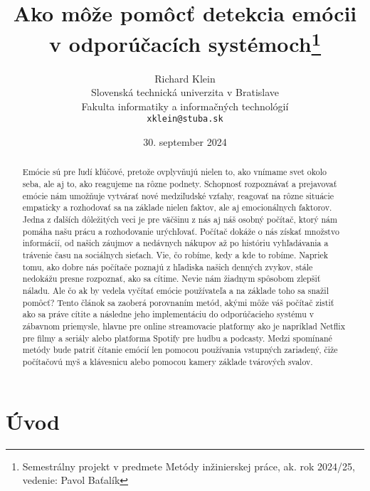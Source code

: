 \documentclass[10pt,slovak,a4paper]{article}
\title{Ako môže pomôcť detekcia emócii v odporúčacích systémoch\thanks{Semestrálny projekt v predmete Metódy inžinierskej práce, ak. rok 2024/25, vedenie: Pavol Baťalík}} %
\author{Richard Klein\\[2pt]
	{\small Slovenská technická univerzita v Bratislave}\\
	{\small Fakulta informatiky a informačných technológií}\\
	{\small \texttt{xklein@stuba.sk}}
	}
\date{\small 30. september 2024} %
\begin{document}
\maketitle
\begin{abstract}
Emócie sú pre ľudí kľúčové, pretože ovplyvňujú nielen to, ako vnímame svet okolo seba, ale aj to, ako reagujeme na rôzne podnety. Schopnosť rozpoznávať a prejavovať emócie nám umožňuje vytvárať nové medziľudské vzťahy, reagovať na rôzne situácie empaticky a rozhodovať sa na základe nielen faktov, ale aj emocionálnych faktorov. Jedna z ďalších dôležitých veci je pre väčšinu z nás aj náš osobný počítač, ktorý nám pomáha našu prácu a rozhodovanie urýchľovať. Počítač dokáže o nás získať množstvo informácií, od našich záujmov a nedávnych nákupov až po históriu vyhľadávania a trávenie času na sociálnych sieťach. Vie, čo robíme, kedy a kde to robíme. Napriek tomu, ako dobre nás počítače poznajú z hľadiska našich denných zvykov, stále nedokážu presne rozpoznať, ako sa cítime. Nevie nám žiadnym spôsobom zlepšiť náladu. Ale čo ak by vedela vyčítať emócie používateľa a na základe toho sa snažil pomôcť? Tento článok sa zaoberá porovnaním metód, akými môže váš počítač zistiť ako sa práve cítite a následne jeho implementáciu do odporúčacieho systému v zábavnom priemysle, hlavne pre online streamovacie platformy ako je napríklad Netflix pre filmy a seriály alebo platforma Spotify pre hudbu a podcasty. Medzi spomínané metódy bude patriť čítanie emócií len pomocou používania vstupných zariadený, čiže počítačovú myš a klávesnicu alebo pomocou kamery základe tvárových svalov. 
\end{abstract}



\section{Úvod}
\end{document}
